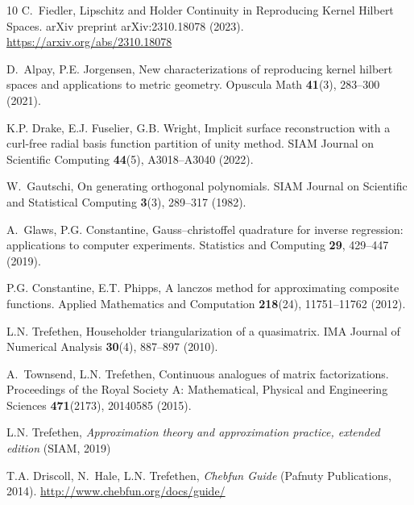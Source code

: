 \documentclass[pdflatex,iicol]{sn-jnl}%
\theoremstyle{thmstyleone}%
\theoremstyle{thmstyletwo}%
\theoremstyle{thmstylethree}%
\begin{document}
\begin{thebibliography}{10}
C.~Fiedler, {Lipschitz and Holder Continuity in Reproducing Kernel Hilbert Spaces}.
\newblock arXiv preprint arXiv:2310.18078  (2023).
\newblock \urlprefix\url{https://arxiv.org/abs/2310.18078}

D.~Alpay, P.E. Jorgensen, New characterizations of reproducing kernel hilbert spaces and applications to metric geometry.
\newblock Opuscula Math \textbf{41}(3), 283--300 (2021).
\newblock {}

K.P. Drake, E.J. Fuselier, G.B. Wright, Implicit surface reconstruction with a curl-free radial basis function partition of unity method.
\newblock SIAM Journal on Scientific Computing \textbf{44}(5), A3018--A3040 (2022).
\newblock {}

W.~Gautschi, On generating orthogonal polynomials.
\newblock SIAM Journal on Scientific and Statistical Computing \textbf{3}(3), 289--317 (1982).
\newblock {}

A.~Glaws, P.G. Constantine, Gauss--christoffel quadrature for inverse regression: applications to computer experiments.
\newblock Statistics and Computing \textbf{29}, 429--447 (2019).
\newblock {}

P.G. Constantine, E.T. Phipps, A lanczos method for approximating composite functions.
\newblock Applied Mathematics and Computation \textbf{218}(24), 11751--11762 (2012).
\newblock {}

L.N. Trefethen, Householder triangularization of a quasimatrix.
\newblock IMA Journal of Numerical Analysis \textbf{30}(4), 887--897 (2010).
\newblock {}

A.~Townsend, L.N. Trefethen, Continuous analogues of matrix factorizations.
\newblock Proceedings of the Royal Society A: Mathematical, Physical and Engineering Sciences \textbf{471}(2173), 20140585 (2015).
\newblock {}

L.N. Trefethen, \emph{Approximation theory and approximation practice, extended edition} (SIAM, 2019)

T.A. Driscoll, N.~Hale, L.N. Trefethen, \emph{Chebfun Guide} (Pafnuty Publications, 2014).
\newblock \urlprefix\url{http://www.chebfun.org/docs/guide/}


\end{thebibliography}
\end{document}
